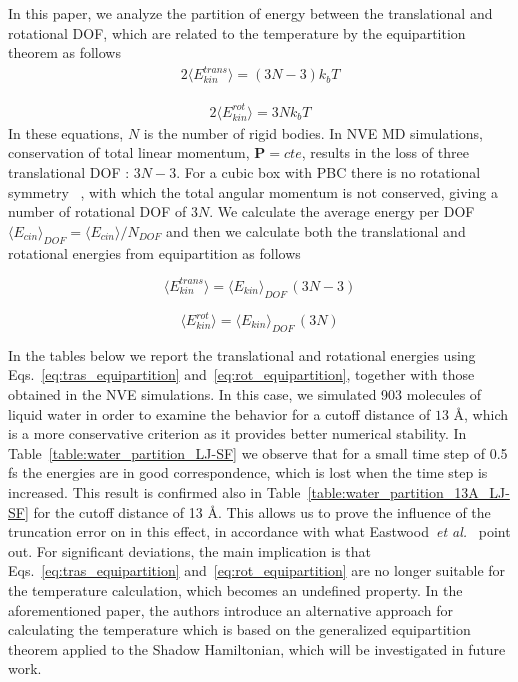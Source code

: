 \documentclass[aip,jcp,reprint,amsmath,amssymb,amsfont]{revtex4-1}
\begin{document}
In this paper, we analyze the partition of energy between the translational and rotational DOF, which are related to the temperature by the equipartition theorem as follows
\begin{align}
\label{eq:tras_equipartition}
2 \langle E_{kin}^{trans} \rangle = (3N - 3) k_b T
\end{align}

\begin{align}
\label{eq:rot_equipartition}
2 \langle E_{kin}^{rot} \rangle = 3N k_b T
\end{align} 
In these equations, $N$ is the number of rigid bodies. In NVE MD simulations, conservation of total linear momentum, $ \boldsymbol{P}= cte $, results in the loss of three translational DOF : $ 3N-3 $. For a cubic box with PBC there is no rotational symmetry ~\cite{Frenkel_2013,Kuzkin_2014}, with which the total angular momentum is not conserved, giving a number of rotational DOF of $3N$.  We calculate the average energy per DOF $ \langle E_{cin} \rangle_{DOF} = \langle E_{cin} \rangle /N_{DOF}$ and then we calculate both the translational and rotational energies from equipartition as follows

\begin{equation}
\langle E_{kin}^{trans}\rangle =  \langle E_{kin} \rangle_{DOF} \, (3N-3)
\end{equation}

\begin{equation}
\langle E_{kin}^{rot} \rangle =  \langle E_{kin} \rangle_{DOF} \, (3N)
\end{equation}


In the tables below we report the translational and rotational energies using Eqs.~\ref{eq:tras_equipartition} and~\ref{eq:rot_equipartition}, together with those obtained in the NVE simulations. In this case, we simulated 903 molecules of liquid water in order to examine the behavior for a cutoff distance of $13$ {\AA}, which is a more conservative criterion as it provides better numerical stability. In Table~\ref{table:water_partition_LJ-SF} we observe that for a small time step of 0.5 fs the energies are in good correspondence, which is lost when the time step is increased. This result is confirmed also in Table~\ref{table:water_partition_13A_LJ-SF} for the cutoff distance of 13 {\AA}. This allows us to prove the influence of the truncation error on in this effect, in accordance with what Eastwood~\textit{et al.}~\cite{Eastwood_2010} point out. For significant deviations, the main implication is that Eqs.~\ref{eq:tras_equipartition} and~\ref{eq:rot_equipartition} are no longer suitable for the temperature calculation, which becomes an undefined property. In the aforementioned paper, the authors introduce an alternative approach for calculating the temperature which is based on the generalized equipartition theorem applied to the Shadow Hamiltonian, which will be investigated in future work.
\end{document}
